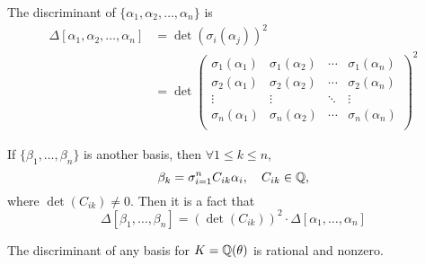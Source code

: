 \begin{definition}
    The discriminant of $\{\alpha_1, \alpha_2, \dots, \alpha_n\}$ is
    \begin{align*}
        \Delta[\alpha_1, \alpha_2, \dots, \alpha_n] & = \det\left(\sigma_i(\alpha_j)\right)^2 \\
                                                    & = \det
        \begin{pmatrix}
            \sigma_1(\alpha_1) & \sigma_1(\alpha_2) & \cdots & \sigma_1(\alpha_n) \\
            \sigma_2(\alpha_1) & \sigma_2(\alpha_2) & \cdots & \sigma_2(\alpha_n) \\
            \vdots             & \vdots             & \ddots & \vdots             \\
            \sigma_n(\alpha_1) & \sigma_n(\alpha_2) & \cdots & \sigma_n(\alpha_n) \\
        \end{pmatrix}^2
    \end{align*}
\end{definition}
If $\{\beta_1, \dots, \beta_n\}$ is another basis, then $\forall 1\leq k\leq n$,
\[\beta_k = \sigma_{i = 1}^n C_{ik}\alpha_i, \quad C_{ik}\in \mathbb Q,\]
where $\det(C_{ik})\neq 0$. Then it is a fact that
\[\Delta[\beta_1, \dots, \beta_n] = \left(\det(C_{ik})\right)^2\cdot \Delta[\alpha_1, \dots, \alpha_n]\]
\begin{theorem}\label{thm:2.7}
    The discriminant of any basis for $K = \mathbb Q(\theta)$ is rational and nonzero.
\end{theorem}
